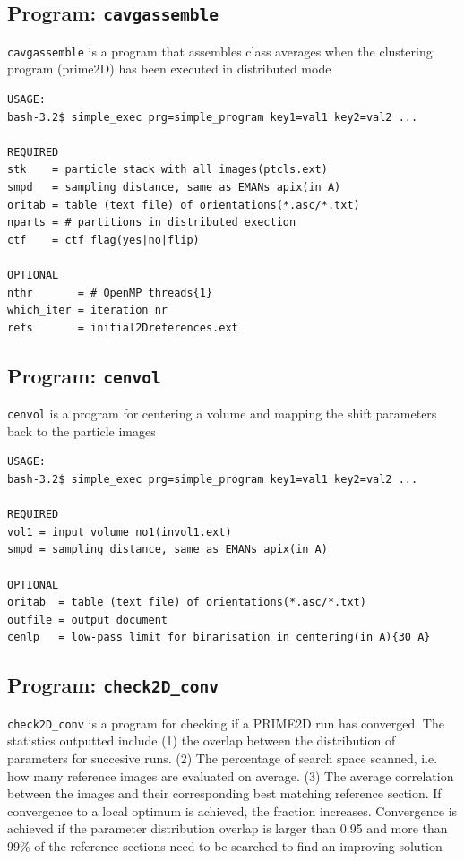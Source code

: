 \documentclass[a4paper,11pt]{article}
\newcommand{\prgname}[1]{\textcolor{NavyBlue}{\texttt{#1}}}
\begin{document}
\subsection{Program: \prgname{cavgassemble}}
\label{cavgassemble}
\prgname{cavgassemble} is a program that assembles class averages when the clustering program (prime2D) has been executed in distributed mode

\begin{verbatim}
USAGE:
bash-3.2$ simple_exec prg=simple_program key1=val1 key2=val2 ...

REQUIRED
stk    = particle stack with all images(ptcls.ext)
smpd   = sampling distance, same as EMANs apix(in A)
oritab = table (text file) of orientations(*.asc/*.txt)
nparts = # partitions in distributed exection
ctf    = ctf flag(yes|no|flip)

OPTIONAL
nthr       = # OpenMP threads{1}
which_iter = iteration nr
refs       = initial2Dreferences.ext
\end{verbatim}

\subsection{Program: \prgname{cenvol}}
\label{cenvol}
\prgname{cenvol} is a program for centering a volume and mapping the shift parameters back to the particle images

\begin{verbatim}
USAGE:
bash-3.2$ simple_exec prg=simple_program key1=val1 key2=val2 ...

REQUIRED
vol1 = input volume no1(invol1.ext)
smpd = sampling distance, same as EMANs apix(in A)

OPTIONAL
oritab  = table (text file) of orientations(*.asc/*.txt)
outfile = output document
cenlp   = low-pass limit for binarisation in centering(in A){30 A}
\end{verbatim}

\subsection{Program: \prgname{check2D\_conv}}
\label{check2D_conv}
\prgname{check2D\_conv} is a program for checking if a PRIME2D run has converged. The statistics outputted include (1) the overlap between the distribution of parameters for succesive runs. (2) The percentage of search space scanned, i.e. how many reference images are evaluated on average. (3) The average correlation between the images and their corresponding best matching reference section. If convergence to a local optimum is achieved, the fraction increases. Convergence is achieved if the parameter distribution overlap is larger than 0.95 and more than 99\% of the reference sections need to be searched to find an improving solution
\end{document}
